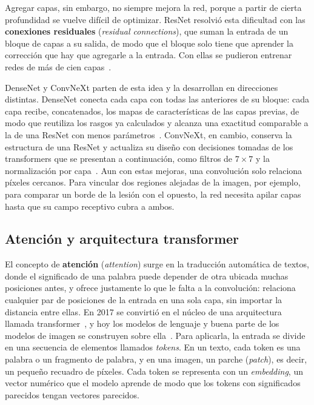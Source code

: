 Agregar capas, sin embargo, no siempre mejora la red, porque a partir de cierta profundidad se vuelve difícil de
optimizar. ResNet resolvió esta dificultad con las \textbf{conexiones residuales} (\emph{residual connections}),
que suman la entrada de un bloque de capas a su salida, de modo que el bloque solo tiene que aprender la
corrección que hay que agregarle a la entrada. Con ellas se pudieron entrenar redes de más de cien
capas~\cite{he2015residual}.

DenseNet y ConvNeXt parten de esta idea y la desarrollan en direcciones distintas. DenseNet conecta cada capa con todas las anteriores de su bloque: cada capa recibe, concatenados, los
mapas de características de las capas previas, de modo que reutiliza los rasgos ya calculados y alcanza una
exactitud comparable a la de una ResNet con menos parámetros~\cite{huang2018densely}. ConvNeXt, en cambio,
conserva la estructura de una ResNet y actualiza su diseño con decisiones tomadas de los transformers que se
presentan a continuación, como filtros de $7 \times 7$ y la normalización por capa~\cite{liu2022convnet}.
Aun con estas mejoras, una convolución solo relaciona píxeles cercanos. Para vincular dos regiones alejadas de
la imagen, por ejemplo, para comparar un borde de la lesión con el opuesto, la red necesita apilar capas hasta
que su campo receptivo cubra a ambos.

\subsection{Atención y arquitectura transformer}
\label{sec:marco_atencion}

El concepto de \textbf{atención} (\emph{attention}) surge en la traducción automática de textos, donde el
significado de una palabra puede depender de otra ubicada muchas posiciones antes, y ofrece justamente lo que le
falta a la convolución: relaciona cualquier par de posiciones de la entrada en una sola capa, sin importar la
distancia entre ellas. En 2017 se convirtió en el núcleo de una arquitectura llamada
transformer~\cite{vaswani2017attention}, y hoy los modelos de lenguaje y buena
parte de los modelos de imagen se construyen sobre ella~\cite{dosovitskiy2021image}. Para aplicarla, la entrada
se divide en una secuencia de elementos llamados \emph{tokens}. En un texto, cada token es una palabra o
un fragmento de palabra, y en una imagen, un parche (\emph{patch}), es decir, un pequeño recuadro de píxeles.
Cada token se representa con un \emph{embedding}, un vector numérico que el modelo aprende de modo que
los tokens con significados parecidos tengan vectores parecidos.

